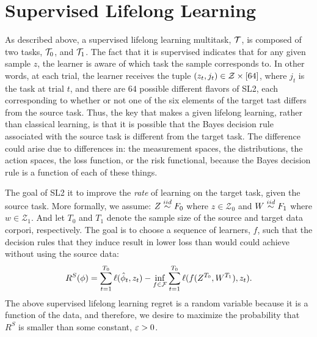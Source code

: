 \documentclass{article}
\begin{document}
\section{Supervised Lifelong Learning}
\label{sec:transfer}

As described above,  a supervised lifelong learning multitask, $\mathcal{T}$, is composed of two tasks, $\mathcal{T}_0$, and $\mathcal{T}_1$.  The fact that it is supervised indicates that for any given sample $z$, the learner is aware of which task the sample corresponds to.  In other words, at each trial, the learner receives the tuple $(z_t, j_t) \in \mathcal{Z} \times [64]$, where $j_t$ is the task at trial $t$, and there are $64$ possible different flavors of SL2, each corresponding to whether or not one of the six elements of the target tast differs from the source task.    
Thus, the key that makes a given lifelong learning, rather than classical learning, is that it is possible that the Bayes decision rule associated with the source task is different from the target task.  The difference could arise due to differences in: the measurement spaces, the distributions, the action spaces, the loss function, or the risk functional, because the Bayes decision rule is a function of each of these things. 





The goal of SL2 it to improve the \emph{rate} of learning on the target task, given the source task. More formally, we assume:
$Z \overset{iid}{\sim} F_0$ where $z \in \mathcal{Z}_0$ and 
$W \overset{iid}{\sim} F_1$ where $w \in \mathcal{Z}_1$.  
And let $T_0$ and $T_1$ denote the sample size of the source and target data corpori, respectively.  
The goal is to choose a sequence of learners, $f$, such that the decision rules that they induce result in lower loss than would could achieve without using the source data:
\begin{align}
    R^S(\phi) = \sum_{t=1}^{T_0} \ell(\hat{\phi}_t, z_t)    - \inf_{f \in \mathcal{F}} \sum_{t=1}^{T_0} \ell(f(Z^{T_0},W^{T_1}), z_t).
\end{align}
The above supervised lifelong learning regret is a random variable because it is a function of the data, and therefore, we desire to maximize the probability that $R^S$ is smaller than some constant, $\varepsilon>0$. 
\end{document}
